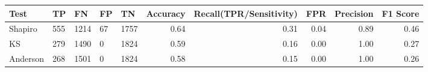 \begin{tabular}{lllllrrrrr}
\toprule
Test & TP & FN & FP & TN & Accuracy & Recall(TPR/Sensitivity) & FPR & Precision & F1 Score \\
\midrule
Shapiro & 555 & 1214 & 67 & 1757 & 0.64 & 0.31 & 0.04 & 0.89 & 0.46 \\
KS & 279 & 1490 & 0 & 1824 & 0.59 & 0.16 & 0.00 & 1.00 & 0.27 \\
Anderson & 268 & 1501 & 0 & 1824 & 0.58 & 0.15 & 0.00 & 1.00 & 0.26 \\
\bottomrule
\end{tabular}
